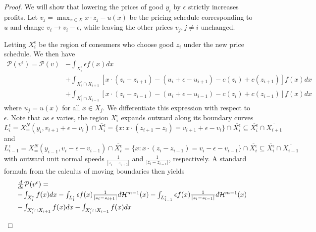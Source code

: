\documentclass[10pt,a4paper]{amsart}
\begin{document}
\begin{proof}We will show that lowering the prices of good $y_i$ by $\epsilon$ strictly increases profits.  Let $v_j = \max_{x \in X}x \cdot z_j - u(x)$ be the pricing schedule corresponding to $u$ and change $v_i \rightarrow v_i -\epsilon$, while leaving the other prices $v_j, j \neq i$ unchanged.

Letting $X_i^\epsilon$ be the region of consumers who choose good $z_i$ under the new price schedule.  We then have
\[\begin{array}{ll}
    \mathcal P(v^\epsilon) = \mathcal P(v)&-\int_{X_i^\epsilon} \epsilon f(x) dx\\
    &+ \int_{X_{i}^\epsilon \cap X_{i+1}}[x \cdot (z_{i}-z_{i+1}) - (u_{i}+\epsilon-u_{i+1}) -c(z_{i}) +c(z_{i+1}) ]f(x)dx \\
    &+ \int_{X_{i}^\epsilon \cap X_{i-1}} [x \cdot (z_{i}-z_{i-1}) - (u_{i}+\epsilon-u_{i-1}) -c(z_{i}) +c(z_{i-1})]
    f(x) dx 
\end{array}\]
where $u_j=u(x)$ for all $x\in X_j.$
 We differentiate this expression with respect to $\epsilon$.  Note that as $\epsilon$ varies, the region $X_i^\epsilon$ expands outward along its boundary curves 
$$
 L_i^\epsilon=X^N_=(y_i, v_{i+1} +\epsilon -v_{i})\cap \overline{ X^\epsilon_i} =\{x: x\cdot (z_{i+1}-z_i) =v_{i+1} +\epsilon -v_{i}\} \cap \overline{ X^\epsilon_i} \subseteq \overline{  X_{i}^\epsilon} \cap \overline{X_{i+1}}
 $$ 
 and 
 $$
 L_{i-1}^\epsilon= X^N_=(y_{i-1}, v_{i} -\epsilon -v_{i-1})\cap \overline{ X^\epsilon_i} =\{x: x\cdot (z_{i}-z_{i-1}) =v_{i} -\epsilon -v_{i-1}\} \cap \overline{ X^\epsilon_i} \subseteq\overline{  X_{i}^\epsilon} \cap \overline{X_{i-1}}
 $$
 with outward unit normal speeds $\frac{1}{|z_i-z_{i+1}|}$ and $\frac{1}{|z_i-z_{i-1}|}$, respectively.  A standard formula from the calculus of moving boundaries then yields 
 \[\begin{array}{ll}
     &\frac{d}{d\epsilon} \mathcal P(v^\epsilon)  =\vspace{3pt}\\
     &-\int_{X_i^\epsilon}f(x)dx -\int_{L^\epsilon_i }\epsilon f(x)\frac{1}{|z_i-z_{i+1}|}d\mathcal H^{m-1}(x) 
     -\int_{L^\epsilon_{i-1}}\epsilon f(x)\frac{1}{|z_i-z_{i-1}|}d\mathcal H^{m-1}(x) \vspace{3pt}\\
     &-\int_{X_{i}^\epsilon \cap X_{i+1}}f(x)dx -\int_{X_{i}^\epsilon \cap X_{i-1}}f(x)dx\vspace{3pt}\\

\end{array}\]
\end{proof}
\end{document}
